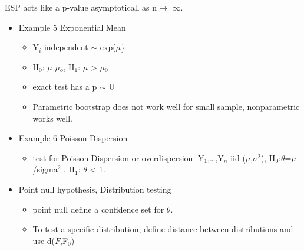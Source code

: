 \documentclass[bigger]{beamer}
\begin{document}
ESP acts like a p-value asymptoticall as n$\rightarrow$ $\infty$.
\begin{itemize}

\item Example 5 Exponential Mean\\
\label{sec-1-7-1}%
\begin{itemize}
\item Y$_i$ independent $\sim$ exp($\mu$\}
\item H$_0$: $\mu$ \leq $\mu$$_o$, H$_1$: $\mu$ > $\mu$$_0$
\item exact test has a p $\sim$ U
\item Parametric bootstrap does not work well for small sample,
  nonparametric works well.
\end{itemize}


\item Example 6 Poisson Dispersion\\
\label{sec-1-7-2}%
\begin{itemize}
\item test for Poisson Dispersion or overdispersion: Y$_1$,\ldots,Y$_n$ iid ($\mu$,$\sigma$$^2$),
  H$_0$:$\theta$=$\mu$/sigma$^2$ , H$_1$: $\theta$ < 1.
\end{itemize}


\item Point null hypothesis, Distribution testing\\
\label{sec-1-7-3}%
\begin{itemize}
\item point null define a confidence set for $\theta$.
\item To test a specific distribution, define distance between
  distributions and use d($\tilde{F}$,F$_0$)
\end{itemize}

\end{itemize} %
\end{document}
